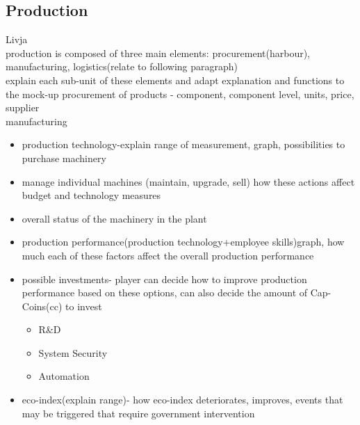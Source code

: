 \documentclass[11pt,titlepage,oneside,openany]{book}
\begin{document}
\subsection{Production}
Livja \\
 production is composed of three main elements: procurement(harbour), manufacturing, logistics(relate to following paragraph)\\
explain each sub-unit of these elements and adapt explanation and functions to the mock-up
procurement of products - component, component level, units, price, supplier \\
manufacturing
\begin{itemize} 
\item production technology-explain range of measurement, graph, possibilities to purchase machinery
\item manage individual machines (maintain, upgrade, sell) how these actions affect budget and technology measures
\item overall status of the machinery in the plant
\item production performance(production technology+employee skills)graph, how much each of these factors affect the overall production performance
 \item possible investments- player can decide how to improve production performance based on these options, can also decide the amount of Cap-Coins(cc) to invest
 \begin{itemize} 
 \item R\&D
 \item System Security
 \item Automation
 \end{itemize}
 \item eco-index(explain range)- how eco-index deteriorates, improves, events that may be triggered that require government intervention
\end{itemize}
\end{document}
